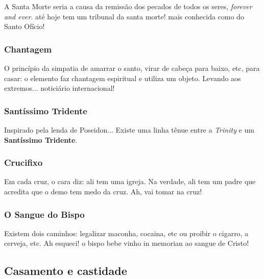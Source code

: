 \documentclass[12pt,a4paper]{article}
\begin{document}
				A Santa Morte seria a causa da remiss\~ao dos pecados de todos os seres, \emph{forever and ever}. at\'e hoje tem um tribunal da santa morte! mais conhecida como do Santo Of\'icio!

			\subsubsection{Chantagem}
				\begin{flushright}
				\end{flushright}

				O princ\'ipio da simpatia de amarrar o santo, virar de cabe\c{c}a para baixo, etc, para casar: o elemento faz chantagem espiritual e utiliza um objeto. Levando aos extremos... notici\'ario internacional!

			\subsubsection{Sant\'issimo Tridente}
				\begin{flushright}
				\end{flushright}

Inspirado pela lenda de Poseidon... Existe uma linha t\^enue entre a \emph{Trinity} e um \textbf{Sant\'issimo
 Tridente}.

			\subsubsection{Crucifixo}
				\begin{flushright}
				\end{flushright}

 Em cada cruz, o cara diz: ali tem uma igreja. Na verdade, ali tem um
padre que acredita que o demo tem medo da cruz. Ah, vai tomar na cruz!

			\subsubsection{O Sangue do Bispo}
				\begin{flushright}
				\end{flushright}

Existem dois caminhos: legalizar maconha, cocaina, etc ou proibir o
cigarro, a cerveja, etc. Ah esqueci! o bispo bebe vinho in memorian ao
sangue de Cristo!

		\subsection{Casamento e castidade}
			\begin{flushright}
			\end{flushright}
\end{document}
